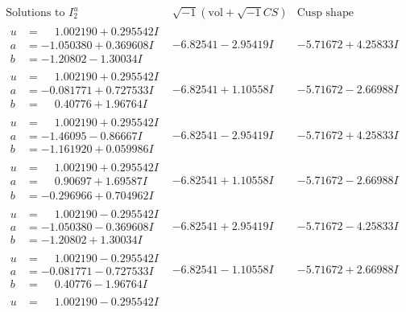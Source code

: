 \documentclass[1p]{elsarticle_modified}
\theoremstyle{definition}
\newcommand{\I}{\sqrt{-1}}
\begin{document}
$$\begin{array}{c|c|c}  
\text{Solutions to }I^u_{2}& \I (\text{vol} + \sqrt{-1}CS) & \text{Cusp shape}\\
 \hline 
\begin{aligned}
u &= \phantom{-}1.002190 + 0.295542 I \\
a &= -1.050380 + 0.369608 I \\
b &= -1.20802 - 1.30034 I\end{aligned}
 & -6.82541 - 2.95419 I & -5.71672 + 4.25833 I \\ \hline\begin{aligned}
u &= \phantom{-}1.002190 + 0.295542 I \\
a &= -0.081771 + 0.727533 I \\
b &= \phantom{-}0.40776 + 1.96764 I\end{aligned}
 & -6.82541 + 1.10558 I & -5.71672 - 2.66988 I \\ \hline\begin{aligned}
u &= \phantom{-}1.002190 + 0.295542 I \\
a &= -1.46095 - 0.86667 I \\
b &= -1.161920 + 0.059986 I\end{aligned}
 & -6.82541 - 2.95419 I & -5.71672 + 4.25833 I \\ \hline\begin{aligned}
u &= \phantom{-}1.002190 + 0.295542 I \\
a &= \phantom{-}0.90697 + 1.69587 I \\
b &= -0.296966 + 0.704962 I\end{aligned}
 & -6.82541 + 1.10558 I & -5.71672 - 2.66988 I \\ \hline\begin{aligned}
u &= \phantom{-}1.002190 - 0.295542 I \\
a &= -1.050380 - 0.369608 I \\
b &= -1.20802 + 1.30034 I\end{aligned}
 & -6.82541 + 2.95419 I & -5.71672 - 4.25833 I \\ \hline\begin{aligned}
u &= \phantom{-}1.002190 - 0.295542 I \\
a &= -0.081771 - 0.727533 I \\
b &= \phantom{-}0.40776 - 1.96764 I\end{aligned}
 & -6.82541 - 1.10558 I & -5.71672 + 2.66988 I \\ \hline\begin{aligned}
u &= \phantom{-}1.002190 - 0.295542 I \\

\end{aligned}
\end{array}$$
\end{document}
